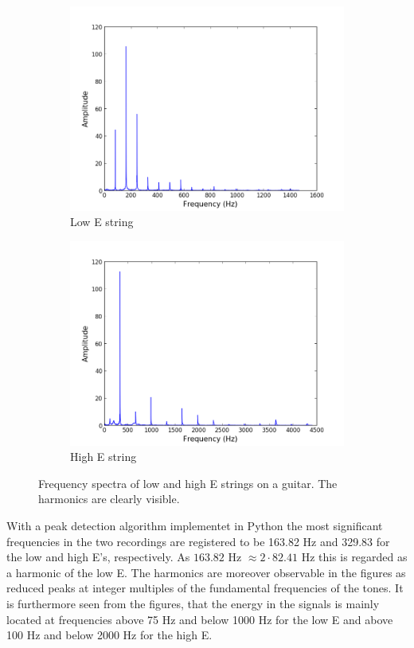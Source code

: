 \begin{figure}[H]
\centering
\begin{subfigure}{0.49\textwidth}
\centering
\includegraphics[width=\textwidth]{figures/freqanal/single_low.png}
\caption{Low E string}
\label{fig:single_low}
\end{subfigure}
\begin{subfigure}{0.49\textwidth}
\centering
\includegraphics[width=\textwidth]{figures/freqanal/single_high.png}
\caption{High E string}
\label{fig:single_high}
\end{subfigure}
\caption{Frequency spectra of low and high E strings on a guitar. The harmonics are clearly visible.}
\label{fig:single}
\end{figure}
With a peak detection algorithm implementet in Python the most significant frequencies in the two recordings are registered to be 163.82 Hz and 329.83 for the low and high E's, respectively. As $163.82$ Hz $\approx 2\cdot82.41$ Hz this is regarded as a harmonic of the low E. The harmonics are moreover observable in the figures as reduced peaks at integer multiples of the fundamental frequencies of the tones. It is furthermore seen from the figures, that the energy in the signals is mainly located at frequencies above 75 Hz and below 1000 Hz for the low E and above 100 Hz and below 2000 Hz for the high E.
